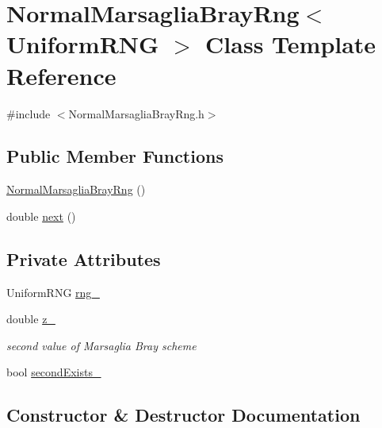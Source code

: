 \hypertarget{class_normal_marsaglia_bray_rng}{}\section{Normal\+Marsaglia\+Bray\+Rng$<$ Uniform\+R\+NG $>$ Class Template Reference}
\label{class_normal_marsaglia_bray_rng}


{\ttfamily \#include $<$Normal\+Marsaglia\+Bray\+Rng.\+h$>$}

\subsection*{Public Member Functions}
\begin{DoxyCompactItemize}
\item 
\hyperlink{class_normal_marsaglia_bray_rng_a4d225dedc26e6dcf154a2902827b2ede}{Normal\+Marsaglia\+Bray\+Rng} ()
\item 
double \hyperlink{class_normal_marsaglia_bray_rng_a2cc54f5f331a5bd71eedc67c84db7279}{next} ()
\end{DoxyCompactItemize}
\subsection*{Private Attributes}
\begin{DoxyCompactItemize}
\item 
Uniform\+R\+NG \hyperlink{class_normal_marsaglia_bray_rng_a590b5bfbb3888d5163c6e3d702bfb2e0}{rng\+\_\+}
\item 
double \hyperlink{class_normal_marsaglia_bray_rng_a6d021a285cd0eb2d95c25cdb8af0ee93}{z\+\_\+}
\begin{DoxyCompactList}\small\item\em second value of Marsaglia Bray scheme \end{DoxyCompactList}\item 
bool \hyperlink{class_normal_marsaglia_bray_rng_a6b795b729e795b1b81aa1b30d5dfe8ef}{second\+Exists\+\_\+}
\end{DoxyCompactItemize}


\subsection{Constructor \& Destructor Documentation}
\hypertarget{class_normal_marsaglia_bray_rng_a4d225dedc26e6dcf154a2902827b2ede}{}\label{class_normal_marsaglia_bray_rng_a4d225dedc26e6dcf154a2902827b2ede} 

